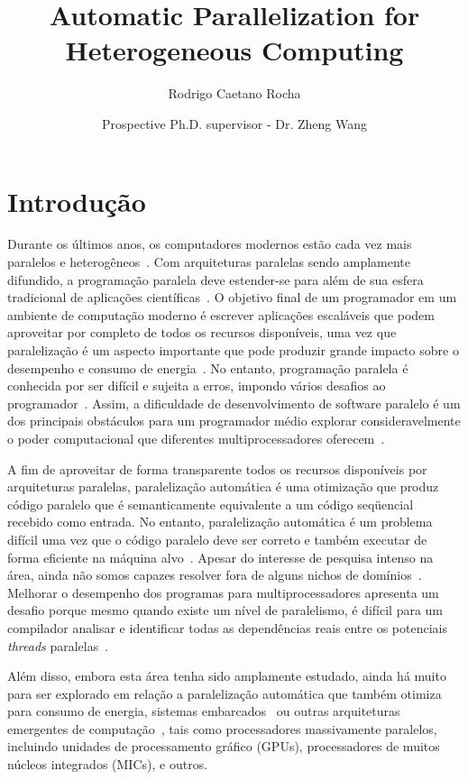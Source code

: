 \documentclass[a4paper,12pt]{article}
\title{\textbf{Automatic Parallelization for Heterogeneous Computing}}
\date{Prospective Ph.D. supervisor - Dr. Zheng Wang}
\author[]{Rodrigo Caetano Rocha}
\begin{document}
\maketitle

\begin{abstract}

\end{abstract}

\section{Introdução} 

Durante os últimos anos, os computadores modernos estão cada vez mais paralelos e
heterogêneos~\cite{mohanty12,misailovic13}. Com arquiteturas paralelas sendo
amplamente difundido, a programação paralela deve estender-se para além de sua esfera tradicional de
aplicações científicas~\cite{li09}. O objetivo final de um programador em um
ambiente de computação moderno é escrever aplicações escaláveis que podem aproveitar por completo
de todos os recursos disponíveis, uma vez que paralelização é um aspecto
importante que pode produzir grande impacto sobre o desempenho e
consumo de energia~\cite{cockx10}. No entanto, programação paralela é conhecida por ser
difícil e sujeita a erros, impondo vários desafios ao programador~\cite{cockx10,mccool10,mccool12}.
Assim, a dificuldade de
desenvolvimento de software paralelo é um dos principais obstáculos para um programador médio
explorar consideravelmente o poder computacional que diferentes multiprocessadores
oferecem~\cite{misailovic13}.

A fim de aproveitar de forma transparente todos os recursos disponíveis por
arquiteturas paralelas, paralelização automática é uma otimização que produz código paralelo que é semanticamente equivalente a um código seqüencial recebido como entrada. No entanto, paralelização automática é um problema difícil uma vez que o código paralelo deve ser correto e também executar de forma eficiente na máquina alvo~\cite{williams99}. Apesar do interesse de  pesquisa intenso na área, ainda não somos capazes resolver fora de alguns nichos de domínios~\cite{tournavitis09,wang14a}. Melhorar o desempenho dos programas para multiprocessadores apresenta um desafio porque mesmo quando existe um nível de paralelismo, é difícil para um compilador analisar e identificar todas as dependências reais entre os potenciais \textit{threads} paralelas~\cite{hammond98}.

Além disso, embora esta área tenha sido amplamente estudado, ainda há muito para ser explorado em relação a paralelização automática que também otimiza para consumo de energia, sistemas embarcados~\cite{cordes10} ou outras arquiteturas emergentes de computação~\cite{baskaran10}, tais como processadores massivamente paralelos, incluindo unidades de processamento gráfico (GPUs), processadores de muitos núcleos integrados (MICs), e outros.
\end{document}

